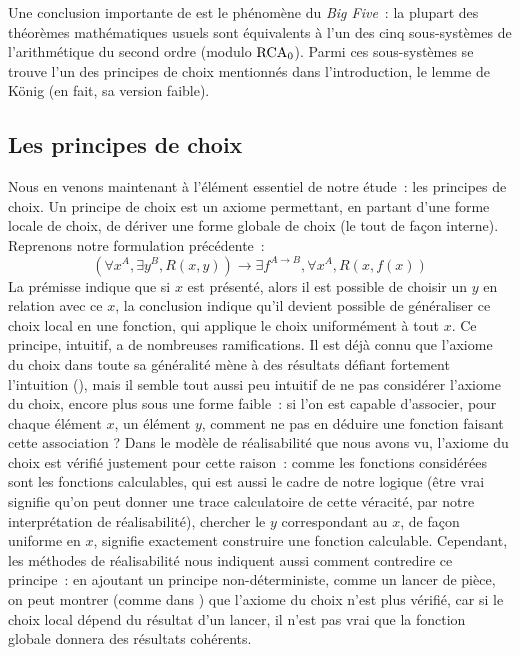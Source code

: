 \documentclass{article}
\begin{document}
Une conclusion importante de \cite{Simpson_2009} est le phénomène du \textit{Big Five}~: la plupart des théorèmes mathématiques usuels sont équivalents à l'un des cinq sous-systèmes de l'arithmétique du second ordre (modulo $\mathrm{RCA}_0$). Parmi ces sous-systèmes se trouve l'un des principes de choix mentionnés dans l'introduction, le lemme de König (en fait, sa version faible).

\subsection{Les principes de choix}

Nous en venons maintenant à l'élément essentiel de notre étude~: les principes de choix. Un principe de choix est un axiome permettant, en partant d'une forme locale de choix, de dériver une forme globale de choix (le tout de façon interne). Reprenons notre formulation précédente~:
\[(\forall x^A, \exists y^B, R(x,y)) \to \exists f^{A\to B}, \forall x^A, R(x,f(x))\]
La prémisse indique que si $x$ est présenté, alors il est possible de choisir un $y$ en relation avec ce $x$, la conclusion indique qu'il devient possible de généraliser ce choix local en une fonction, qui applique le choix uniformément à tout $x$. Ce principe, intuitif, a de nombreuses ramifications. Il est déjà connu que l'axiome du choix dans toute sa généralité mène à des résultats défiant fortement l'intuition (\cite{Banach1924-BANSLD}), mais il semble tout aussi peu intuitif de ne pas considérer l'axiome du choix, encore plus sous une forme faible~: si l'on est capable d'associer, pour chaque élément $x$, un élément $y$, comment ne pas en déduire une fonction faisant cette association ? Dans le modèle de réalisabilité que nous avons vu, l'axiome du choix est vérifié justement pour cette raison~: comme les fonctions considérées sont les fonctions calculables, qui est aussi le cadre de notre logique (être vrai signifie qu'on peut donner une trace calculatoire de cette véracité, par notre interprétation de réalisabilité), chercher le $y$ correspondant au $x$, de façon uniforme en $x$, signifie exactement construire une fonction calculable. Cependant, les méthodes de réalisabilité nous indiquent aussi comment contredire ce principe~: en ajoutant un principe non-déterministe, comme un lancer de pièce, on peut montrer (comme dans \cite{COHEN201987}) que l'axiome du choix n'est plus vérifié, car si le choix local dépend du résultat d'un lancer, il n'est pas vrai que la fonction globale donnera des résultats cohérents.
\end{document}
